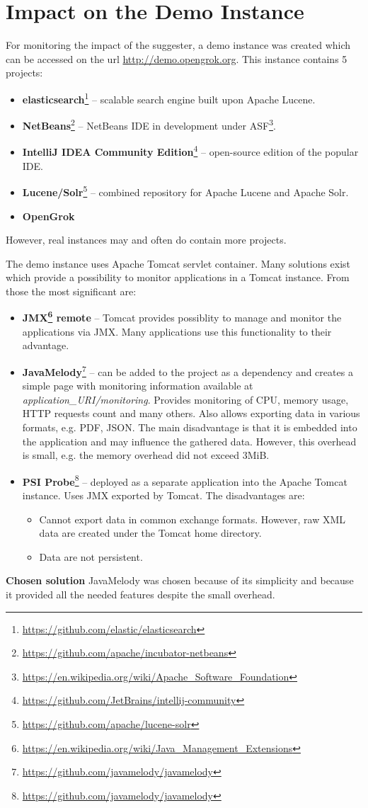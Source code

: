 \section{Impact on the Demo Instance}
For monitoring the impact of the suggester, a demo instance was created which can be accessed on the url
\url{http://demo.opengrok.org}. This instance contains 5 projects:
\begin{itemize}
    \item \textbf{elasticsearch}\footnote{\url{https://github.com/elastic/elasticsearch}} – scalable search engine built
    upon Apache Lucene.
    \item \textbf{NetBeans}\footnote{\url{https://github.com/apache/incubator-netbeans}} – NetBeans IDE in development
    under ASF\footnote{\url{https://en.wikipedia.org/wiki/Apache\_Software\_Foundation}}.
    \item \textbf{IntelliJ IDEA Community Edition}\footnote{\url{https://github.com/JetBrains/intellij-community}} –
    open-source edition of the popular IDE.
    \item \textbf{Lucene/Solr}\footnote{\url{https://github.com/apache/lucene-solr}} – combined repository for Apache
    Lucene and Apache Solr.
    \item \textbf{OpenGrok}
\end{itemize}
However, real instances may and often do contain more projects.

The demo instance uses Apache Tomcat servlet container. Many solutions exist which provide a possibility to monitor
applications in a Tomcat instance. From those the most significant are:
\begin{itemize}
    \item \textbf{JMX\footnote{\url{https://en.wikipedia.org/wiki/Java\_Management\_Extensions}} remote} –
    Tomcat provides possiblity to manage and monitor the applications via JMX. Many applications use this functionality
    to their advantage.
    \item \textbf{JavaMelody}\footnote{\url{https://github.com/javamelody/javamelody}} – can be added to the project as a
    dependency and creates a simple page with monitoring information available at \textit{application\_URI/monitoring}.
    Provides monitoring of CPU, memory usage, HTTP requests count and many others. Also allows exporting data in
    various formats, e.g. PDF, JSON. The main disadvantage is that it is embedded into the application and may influence
    the gathered data. However, this overhead is small, e.g. the memory overhead did not exceed 3MiB.
    \item \textbf{PSI Probe}\footnote{\url{https://github.com/javamelody/javamelody}} – deployed as a separate
    application into the Apache Tomcat instance. Uses JMX exported by Tomcat. The disadvantages are:
    \begin{itemize}
        \item Cannot export data in common exchange formats. However, raw XML data are created under the Tomcat
        home directory.
        \item Data are not persistent.
    \end{itemize}
\end{itemize}

\textbf{Chosen solution} JavaMelody was chosen because of its simplicity and because it provided all the needed
features despite the small overhead.
